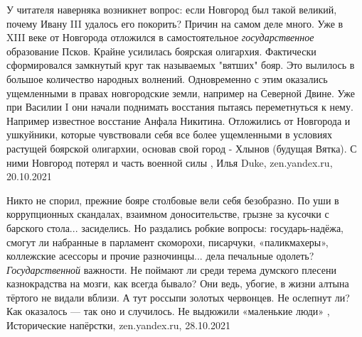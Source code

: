 У читателя наверняка возникнет вопрос: если Новгород был такой великий, почему
Ивану III удалось его покорить? Причин на самом деле много. Уже в XIII веке от
Новгорода отложился в самостоятельное \emph{государственное} образование Псков. Крайне
усилилась боярская олигархия. Фактически сформировался замкнутый круг так
называемых "вятших" бояр. Это вылилось в большое количество народных волнений.
Одновременно с этим оказались ущемленными в правах новгородские земли, например
на Северной Двине. Уже при Василии I они начали поднимать восстания пытаясь
переметнуться к нему. Например известное восстание Анфала Никитина. Отложились
от Новгорода и ушкуйники, которые чувствовали себя все более ущемленными в
условиях растущей боярской олигархии, основав свой город - Хлынов (будущая
Вятка). С ними Новгород потерял и часть военной силы
, Илья Duke, zen.yandex.ru, 20.10.2021

Никто не спорил, прежние бояре столбовые вели себя безобразно. По уши в
коррупционных скандалах, взаимном доносительстве, грызне за кусочки с барского
стола... засиделись. Но раздались робкие вопросы: государь-надёжа, смогут ли
набранные в парламент скоморохи, писарчуки, «паликмахеры», коллежские асессоры
и прочие разночинцы... дела печальные одолеть? \emph{Государственной} важности.
Не поймают ли среди терема думского плесени казнокрадства на мозги, как всегда
бывало? Они ведь, убогие, в жизни алтына тёртого не видали вблизи. А тут
россыпи золотых червонцев. Не ослепнут ли? Как оказалось — так оно и случилось.
Не выдюжили «маленькие люди»
, 
Исторические напёрстки, zen.yandex.ru, 28.10.2021
